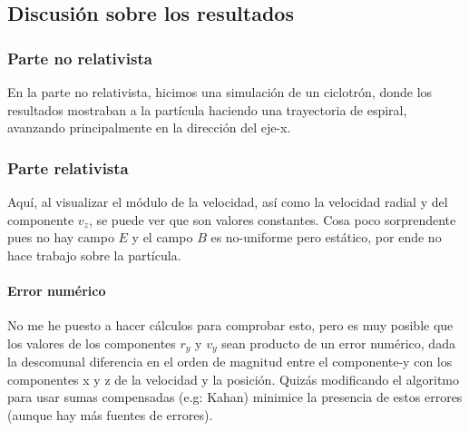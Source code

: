 \subsection{Discusión sobre los resultados}

\subsubsection{Parte no relativista} En la parte no relativista, hicimos una simulación de un ciclotrón, donde los resultados mostraban a la partícula haciendo una trayectoria de espiral, avanzando principalmente en la dirección del eje-x. 

\subsubsection{Parte relativista} Aquí, al visualizar el módulo de la velocidad, así como la velocidad radial y del componente $v_z$, se puede ver que son valores constantes. Cosa poco sorprendente pues no hay campo $E$ y el campo $B$ es no-uniforme pero estático, por ende no hace trabajo sobre la partícula.  

\paragraph{Error numérico}No me he puesto a hacer cálculos para comprobar esto, pero es muy posible que los valores de los componentes $r_y$ y $v_y$ sean producto de un error numérico, dada la descomunal diferencia en el orden de magnitud entre el componente-y con los componentes x y z de la velocidad y la posición. Quizás modificando el algoritmo para usar sumas compensadas (e.g: Kahan) minimice la presencia de estos errores (aunque hay más fuentes de errores). 
